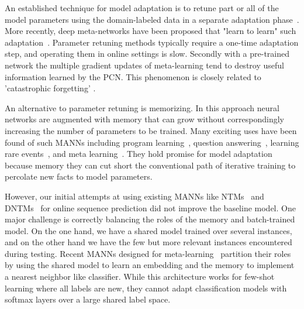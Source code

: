 \documentclass[letterpaper]{article} %
\def\shiv#1{\todo [color=orange]{Shiv: #1}}
\begin{document}
An established technique for model adaptation is to retune part or all of the model parameters using the domain-labeled data in a separate adaptation phase~\cite{daume2007}.  More recently, deep meta-networks have been proposed that "learn to learn" such adaptation~\cite{Rei15,Finn2017ModelAgnosticMF,Huang2015MaximumAP,ravi17}. Parameter retuning methods typically require a one-time adaptation step, and operating them in online settings is slow.
Secondly with a pre-trained network the multiple gradient updates of meta-learning tend to destroy useful information learned by the PCN. This phenomenon is closely related to 'catastrophic forgetting'  \cite{French99,KirkpatrickPRVD16}.

An alternative to parameter retuning is memorizing.  In this approach neural networks are augmented  with memory that can grow without correspondingly increasing the number of parameters to be trained.  Many exciting uses have been found of such MANNs including program learning~\cite{GravesNTM}, question answering~\cite{Weston16,GulcehreCCB16}, learning rare events~\cite{kaiser2017}, and meta learning~\cite{SantoroBBWL16}.  They hold promise for model adaptation because memory they can cut short the conventional path of iterative training to percolate new facts to model parameters.



However, our initial attempts at using existing MANNs like NTMs~\cite{GravesNTM} and DNTMs~\cite{GulcehreCCB16} for online sequence prediction did not improve the baseline model. One major challenge is correctly balancing the roles of the memory and batch-trained model.   On the one hand, we have a shared model trained over several instances, and on the other hand we have the few but more relevant instances encountered during testing. Recent MANNs designed for meta-learning~\cite{SantoroBBWL16} partition their roles by using the shared model to learn an embedding and the memory to implement a nearest neighbor like classifier. While this architecture works for few-shot learning where all labels are new, they cannot adapt classification models with softmax layers over a large shared label space.
\end{document}
